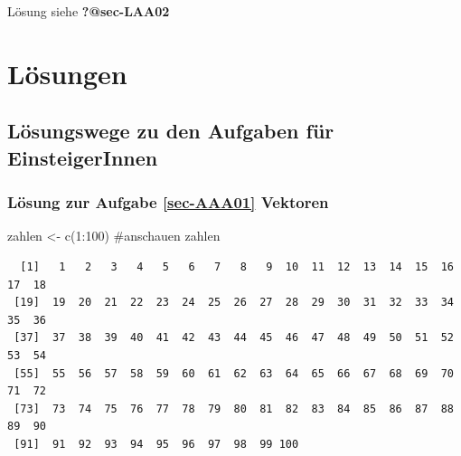 \documentclass[
  11pt,
  a4paperpaper,
]{scrreprt}
\newenvironment{Shaded}{\begin{snugshade}}{\end{snugshade}}
\newcommand{\CommentTok}[1]{\textcolor[rgb]{0.37,0.37,0.37}{#1}}
\newcommand{\DecValTok}[1]{\textcolor[rgb]{0.68,0.00,0.00}{#1}}
\newcommand{\FunctionTok}[1]{\textcolor[rgb]{0.28,0.35,0.67}{#1}}
\newcommand{\NormalTok}[1]{\textcolor[rgb]{0.00,0.23,0.31}{#1}}
\newcommand{\OtherTok}[1]{\textcolor[rgb]{0.00,0.23,0.31}{#1}}
\newcommand{\SpecialCharTok}[1]{\textcolor[rgb]{0.37,0.37,0.37}{#1}}
\begin{document}
\begin{tcolorbox}[enhanced jigsaw, arc=.35mm, breakable, left=2mm, opacityback=0, toprule=.15mm, bottomrule=.15mm, colback=white, colframe=quarto-callout-tip-color-frame, leftrule=.75mm, rightrule=.15mm]
\begin{minipage}[t]{5.5mm}
\textcolor{quarto-callout-tip-color}{\faLightbulb}
\end{minipage}%
\begin{minipage}[t]{\textwidth - 5.5mm}

Lösung siehe \textbf{?@sec-LAA02}

\end{minipage}%
\end{tcolorbox}

\part{Lösungen}

\chapter{Lösungswege zu den Aufgaben für
EinsteigerInnen}\label{sec-LoesungAnfang}

\section{\texorpdfstring{Lösung zur Aufgabe \ref{sec-AAA01}
Vektoren}{Lösung zur Aufgabe  Vektoren}}\label{sec-LAA01}

\begin{tcolorbox}[enhanced jigsaw, breakable, left=2mm, colbacktitle=quarto-callout-tip-color!10!white, coltitle=black, colframe=quarto-callout-tip-color-frame, arc=.35mm, toptitle=1mm, opacitybacktitle=0.6, rightrule=.15mm, opacityback=0, toprule=.15mm, bottomrule=.15mm, colback=white, title=\textcolor{quarto-callout-tip-color}{\faLightbulb}\hspace{0.5em}{a) Erzeugen Sie mit möglichst wenig Aufwand einen Datenvektor aus den
Zahlen 1 bis 100.}, leftrule=.75mm, titlerule=0mm, bottomtitle=1mm]

\begin{Shaded}
\begin{Highlighting}[]
\NormalTok{zahlen }\OtherTok{\textless{}{-}} \FunctionTok{c}\NormalTok{(}\DecValTok{1}\SpecialCharTok{:}\DecValTok{100}\NormalTok{)}
\CommentTok{\#anschauen}
\NormalTok{zahlen}
\end{Highlighting}
\end{Shaded}

\begin{verbatim}
  [1]   1   2   3   4   5   6   7   8   9  10  11  12  13  14  15  16  17  18
 [19]  19  20  21  22  23  24  25  26  27  28  29  30  31  32  33  34  35  36
 [37]  37  38  39  40  41  42  43  44  45  46  47  48  49  50  51  52  53  54
 [55]  55  56  57  58  59  60  61  62  63  64  65  66  67  68  69  70  71  72
 [73]  73  74  75  76  77  78  79  80  81  82  83  84  85  86  87  88  89  90
 [91]  91  92  93  94  95  96  97  98  99 100
\end{verbatim}

\end{tcolorbox}
\end{document}
